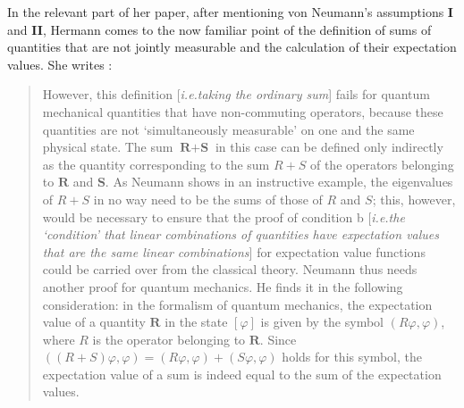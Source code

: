 \documentclass[12pt]{article}
\begin{document}
In the relevant part of her paper, after mentioning von Neumann's assumptions \textbf{I} and \textbf{II}, Hermann comes to the now familiar point of the definition of sums of quantities that are not jointly measurable and the calculation of their expectation values. She writes \cite[p.\@ 250]{crull}:
\begin{quote}
However, this definition [\emph{i.e.\@ taking the ordinary sum}] fails for quantum mechanical quantities that have non-commuting
operators, because these quantities are not `simultaneously measurable' on one and the same physical state. The sum $\textbf{R} + \textbf{S}$ in this case can be defined only indirectly as the quantity corresponding to the sum $R + S$ of the operators belonging to $\textbf{R}$ and $\textbf{S}$. As Neumann shows in an instructive example, the eigenvalues of $R + S$ in no way need to be the sums of those of $R$ and $S$;
this, however, would be necessary to ensure that the proof of condition b [\emph{i.e.\@ the `condition' that linear combinations of quantities have expectation values that are the same linear combinations}] for expectation value functions could be carried over from the classical theory. Neumann thus needs another proof for quantum mechanics. He finds it in the following consideration: in the formalism of quantum mechanics, the expectation value of a quantity $\textbf{R}$ in the state $[\varphi]$ is given by the symbol $(R\varphi,\varphi)$, where $R$ is the operator belonging to $\textbf{R}$. Since $((R + S)\varphi, \varphi) = (R\varphi, \varphi)+ (S\varphi, \varphi)$ holds for this symbol, the expectation value of a sum is indeed equal to the sum of the expectation values.
\end{quote}
\end{document}
